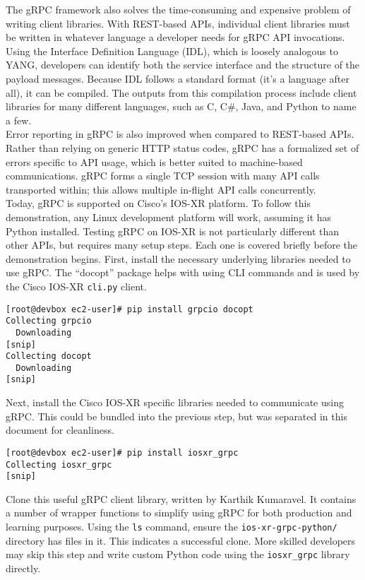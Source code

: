 The gRPC framework also solves the time-consuming and expensive problem of
writing client libraries. With REST-based APIs, individual client libraries
must be written in whatever language a developer needs for gRPC API
invocations. Using the Interface Definition Language (IDL), which is loosely
analogous to YANG, developers can identify both the service interface and the
structure of the payload messages. Because IDL follows a standard format (it's
a language after all), it can be compiled. The outputs from this compilation
process include client libraries for many different languages, such as C, C\#,
Java, and Python to name a few. \\

Error reporting in gRPC is also improved when compared to REST-based APIs.
Rather than relying on generic HTTP status codes, gRPC has a formalized set of
errors specific to API usage, which is better suited to machine-based
communications. gRPC forms a single TCP session with many API calls
transported within; this allows multiple in-flight API calls concurrently. \\

Today, gRPC is supported on Cisco's IOS-XR platform. To follow this
demonstration, any Linux development platform will work, assuming it has
Python installed. Testing gRPC on IOS-XR is not particularly different than
other APIs, but requires many setup steps. Each one is covered briefly before
the demonstration begins. First, install the necessary underlying libraries
needed to use gRPC. The ``docopt'' package helps with using CLI commands and is
used by the Cisco IOS-XR \verb|cli.py| client. \\

\begin{verbatim}
[root@devbox ec2-user]# pip install grpcio docopt
Collecting grpcio
  Downloading
[snip]
Collecting docopt
  Downloading
[snip]
\end{verbatim}

Next, install the Cisco IOS-XR specific libraries needed to communicate using
gRPC. This could be bundled into the previous step, but was separated in this
document for cleanliness.

\begin{verbatim}
[root@devbox ec2-user]# pip install iosxr_grpc
Collecting iosxr_grpc
[snip]
\end{verbatim}

Clone this useful gRPC client library, written by Karthik Kumaravel. It
contains a number of wrapper functions to simplify using gRPC for both
production and learning purposes. Using the \verb|ls| command, ensure the
\verb|ios-xr-grpc-python/| directory has files in it. This indicates a successful
clone. More skilled developers may skip this step and write custom Python code
using the \verb|iosxr_grpc| library directly.

